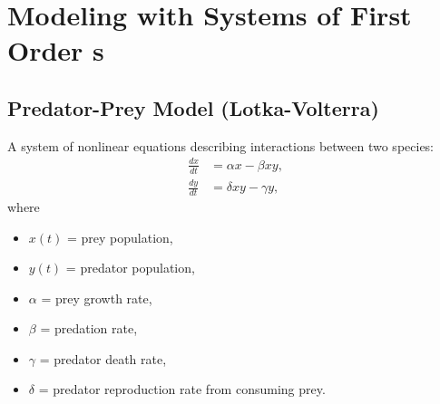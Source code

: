 \section{Modeling with Systems of First Order \ode{}s}
  \subsection*{Predator-Prey Model (Lotka-Volterra)}
  A system of nonlinear equations describing interactions between two species:
  \[
  \begin{aligned}
  \frac{dx}{dt} &= \alpha x - \beta xy, \\
  \frac{dy}{dt} &= \delta xy - \gamma y,
  \end{aligned}
  \]
  where 
  \begin{itemize}
      \item $x(t)$ = prey population,
      \item $y(t)$ = predator population,
      \item $\alpha$ = prey growth rate,
      \item $\beta$ = predation rate,
      \item $\gamma$ = predator death rate,
      \item $\delta$ = predator reproduction rate from consuming prey.
  \end{itemize}


